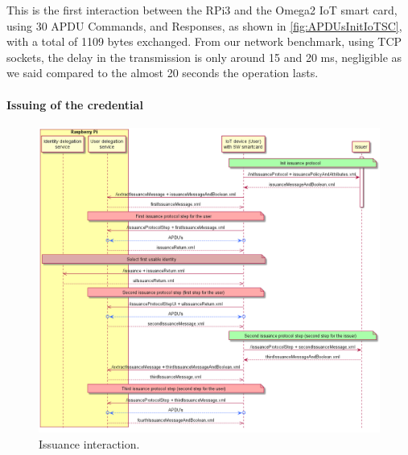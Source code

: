 This is the first interaction between the RPi3 and the Omega2 IoT smart card, using 30 APDU Commands, and Responses, as shown in \autoref{fig:APDUsInitIoTSC}, with a total of 1109 bytes exchanged. From our network benchmark, using TCP sockets, the delay in the transmission is only around 15 and 20 ms, negligible as we said compared to the almost 20 seconds the operation lasts.


\paragraph{Issuing of the credential}
\begin{figure}[bth]
	\begin{center}
		\includegraphics[width=\linewidth]{gfx/IssuanceInteraction}
	\end{center}
	\caption{Issuance interaction.}
	\label{fig:IssuanceInteraction}
\end{figure}


